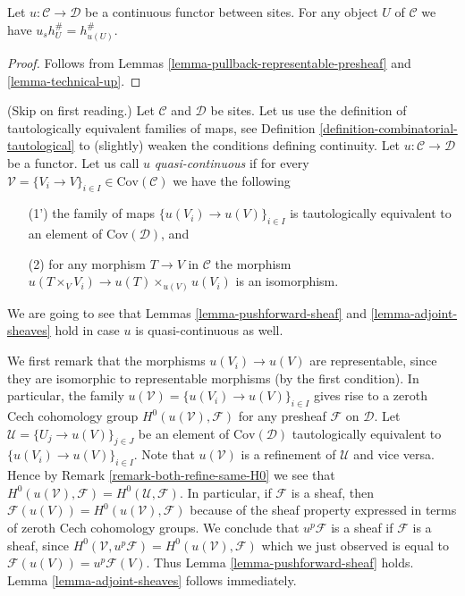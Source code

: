 \begin{lemma}
\label{lemma-pullback-representable-sheaf}
Let $u : \mathcal{C} \to \mathcal{D}$ be a continuous functor
between sites.
For any object $U$ of $\mathcal{C}$ we have $u_sh_U^\# = h_{u(U)}^\#$.
\end{lemma}

\begin{proof}
Follows from
Lemmas \ref{lemma-pullback-representable-presheaf}
and \ref{lemma-technical-up}.
\end{proof}


\begin{remark}
\label{remark-quasi-continuous}
(Skip on first reading.)
Let $\mathcal{C}$ and $\mathcal{D}$ be sites. Let us
use the definition of tautologically equivalent families of maps,
see Definition \ref{definition-combinatorial-tautological}
to (slightly) weaken the conditions defining continuity.
Let $u : \mathcal{C} \to \mathcal{D}$ be a functor.
Let us call $u$ {\it quasi-continuous} if for every
$\mathcal{V} = \{V_i \to V\}_{i\in I} \in \text{Cov}(\mathcal{C})$
we have the following
\begin{enumerate}
\item[(1')] the family of maps
$\{u(V_i) \to u(V)\}_{i\in I}$ is tautologically equivalent
to an element of $\text{Cov}(\mathcal{D})$, and
\item[(2)] for any morphism $T \to V$ in $\mathcal{C}$ the morphism
$u(T \times_V V_i) \to u(T) \times_{u(V)} u(V_i)$ is an isomorphism.
\end{enumerate}
We are going to see that Lemmas \ref{lemma-pushforward-sheaf}
and \ref{lemma-adjoint-sheaves} hold in case
$u$ is quasi-continuous as well.

\medskip\noindent
We first remark that the morphisms $u(V_i) \to u(V)$ are representable, since
they are isomorphic to representable morphisms (by the first condition).
In particular, the family $u(\mathcal{V}) = \{u(V_i) \to u(V)\}_{i\in I}$
gives rise to a zeroth Cech cohomology group
$H^0(u(\mathcal{V}), \mathcal{F})$ for any presheaf $\mathcal{F}$ on
$\mathcal{D}$.
Let $\mathcal{U} = \{U_j \to u(V)\}_{j \in J}$ be an element
of $\text{Cov}(\mathcal{D})$ tautologically
equivalent to $\{u(V_i) \to u(V)\}_{i \in I}$. Note that $u(\mathcal{V})$
is a refinement of $\mathcal{U}$ and vice versa. Hence by Remark
\ref{remark-both-refine-same-H0} we see that
$H^0(u(\mathcal{V}), \mathcal{F}) = H^0(\mathcal{U}, \mathcal{F})$.
In particular, if $\mathcal{F}$ is a sheaf, then
$\mathcal{F}(u(V)) = H^0(u(\mathcal{V}), \mathcal{F})$ because
of the sheaf property expressed in terms of zeroth Cech cohomology
groups. We conclude that $u^p\mathcal{F}$ is a sheaf if $\mathcal{F}$
is a sheaf, since $H^0(\mathcal{V}, u^p\mathcal{F}) =
H^0(u(\mathcal{V}), \mathcal{F})$ which we just observed is
equal to $\mathcal{F}(u(V)) = u^p\mathcal{F}(V)$. Thus Lemma
\ref{lemma-pushforward-sheaf} holds. Lemma \ref{lemma-adjoint-sheaves}
follows immediately.
\end{remark}






